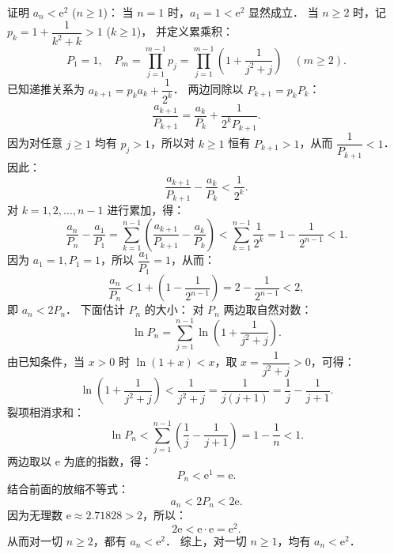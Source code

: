 \begin{answer}
证明 $a_n < \mathrm{e}^2$ ($n \geqslant 1$)：
当 $n = 1$ 时，$a_1 = 1 < \mathrm{e}^2$ 显然成立．
当 $n \geqslant 2$ 时，记 $p_k = 1 + \dfrac{1}{k^2 + k} > 1$ ($k \geqslant 1$)，
并定义累乘积：
\nopagebreak[4]
\[
P_1 = 1, \quad P_m = \prod_{j=1}^{m-1} p_j = \prod_{j=1}^{m-1} \left(1 + \frac{1}{j^2 + j}\right) \quad (m \geqslant 2).
\]
已知递推关系为 $a_{k+1} = p_k a_k + \dfrac{1}{2^k}$．
两边同除以 $P_{k+1} = p_k P_k$：
\nopagebreak[4]
\[
\frac{a_{k+1}}{P_{k+1}} = \frac{a_k}{P_k} + \frac{1}{2^k P_{k+1}}.
\]
因为对任意 $j \geqslant 1$ 均有 $p_j > 1$，所以对 $k \geqslant 1$ 恒有 $P_{k+1} > 1$，从而 $\dfrac{1}{P_{k+1}} < 1$．
因此：
\nopagebreak[4]
\[
\frac{a_{k+1}}{P_{k+1}} - \frac{a_k}{P_k} < \frac{1}{2^k}.
\]
对 $k = 1, 2, \dots, n-1$ 进行累加，得：
\nopagebreak[4]
\[
\frac{a_n}{P_n} - \frac{a_1}{P_1} = \sum_{k=1}^{n-1} \left(\frac{a_{k+1}}{P_{k+1}} - \frac{a_k}{P_k}\right) < \sum_{k=1}^{n-1} \frac{1}{2^k} = 1 - \frac{1}{2^{n-1}} < 1.
\]
因为 $a_1 = 1, P_1 = 1$，所以 $\dfrac{a_1}{P_1} = 1$，从而：
\nopagebreak[4]
\[
\frac{a_n}{P_n} < 1 + \left(1 - \frac{1}{2^{n-1}}\right) = 2 - \frac{1}{2^{n-1}} < 2,
\]
即 $a_n < 2 P_n$．
下面估计 $P_n$ 的大小：
对 $P_n$ 两边取自然对数：
\nopagebreak[4]
\[
\ln P_n = \sum_{j=1}^{n-1} \ln\left(1 + \frac{1}{j^2 + j}\right).
\]
由已知条件，当 $x > 0$ 时 $\ln(1 + x) < x$，取 $x = \dfrac{1}{j^2 + j} > 0$，可得：
\nopagebreak[4]
\[
\ln\left(1 + \frac{1}{j^2 + j}\right) < \frac{1}{j^2 + j} = \frac{1}{j(j+1)} = \frac{1}{j} - \frac{1}{j+1}.
\]
裂项相消求和：
\nopagebreak[4]
\[
\ln P_n < \sum_{j=1}^{n-1} \left(\frac{1}{j} - \frac{1}{j+1}\right) = 1 - \frac{1}{n} < 1.
\]
两边取以 $\mathrm{e}$ 为底的指数，得：
\nopagebreak[4]
\[
P_n < \mathrm{e}^1 = \mathrm{e}.
\]
结合前面的放缩不等式：
\nopagebreak[4]
\[
a_n < 2 P_n < 2\mathrm{e}.
\]
因为无理数 $\mathrm{e} \approx 2.71828 > 2$，所以：
\nopagebreak[4]
\[
2\mathrm{e} < \mathrm{e} \cdot \mathrm{e} = \mathrm{e}^2.
\]
从而对一切 $n \geqslant 2$，都有 $a_n < \mathrm{e}^2$．
综上，对一切 $n \geqslant 1$，均有 $a_n < \mathrm{e}^2$．



\end{answer}